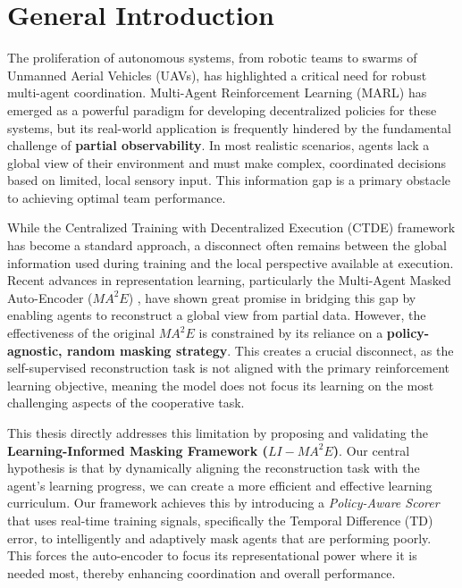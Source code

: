 \chapter*{General Introduction}
\label{chap:introduction}


The proliferation of autonomous systems, from robotic teams to swarms of Unmanned Aerial Vehicles (UAVs), has highlighted a critical need for robust multi-agent coordination. Multi-Agent Reinforcement Learning (MARL) has emerged as a powerful paradigm for developing decentralized policies for these systems, but its real-world application is frequently hindered by the fundamental challenge of \textbf{partial observability}. In most realistic scenarios, agents lack a global view of their environment and must make complex, coordinated decisions based on limited, local sensory input. This information gap is a primary obstacle to achieving optimal team performance.

While the Centralized Training with Decentralized Execution (CTDE) framework has become a standard approach, a disconnect often remains between the global information used during training and the local perspective available at execution. Recent advances in representation learning, particularly the Multi-Agent Masked Auto-Encoder ($MA^2E$) \cite{ma2e}, have shown great promise in bridging this gap by enabling agents to reconstruct a global view from partial data. However, the effectiveness of the original $MA^2E$ is constrained by its reliance on a \textbf{policy-agnostic, random masking strategy}. This creates a crucial disconnect, as the self-supervised reconstruction task is not aligned with the primary reinforcement learning objective, meaning the model does not focus its learning on the most challenging aspects of the cooperative task.

This thesis directly addresses this limitation by proposing and validating the \textbf{Learning-Informed Masking Framework ($LI-MA^2E$)}. Our central hypothesis is that by dynamically aligning the reconstruction task with the agent's learning progress, we can create a more efficient and effective learning curriculum. Our framework achieves this by introducing a \textit{Policy-Aware Scorer} that uses real-time training signals, specifically the Temporal Difference (TD) error, to intelligently and adaptively mask agents that are performing poorly. This forces the auto-encoder to focus its representational power where it is needed most, thereby enhancing coordination and overall performance.

